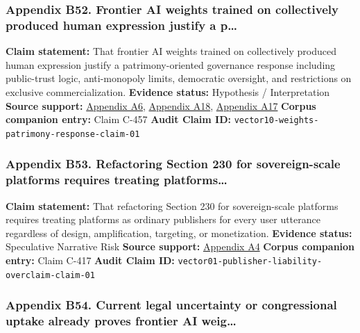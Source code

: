 \documentclass[
  american,
  11pt,
  letterpaper,
]{article}
\begin{document}
\subsubsection{Appendix B52. Frontier AI weights trained on collectively
produced human expression justify a
p\ldots{}}\label{appendix-b52-frontier-ai-weights-trained-on-collectively-produced-human-expression-justify-a-p}

\textbf{Claim statement:} That frontier AI weights trained on
collectively produced human expression justify a patrimony-oriented
governance response including public-trust logic, anti-monopoly limits,
democratic oversight, and restrictions on exclusive commercialization.
\textbf{Evidence status:} Hypothesis / Interpretation \textbf{Source
support:}
\hyperref[appendix-a6-copyright-and-artificial-intelligence-part-3-generative-ai-training-pre-publication-version]{Appendix
A6},
\hyperref[appendix-a18-bipartisan-house-task-force-report-on-artificial-intelligence]{Appendix
A18},
\hyperref[appendix-a17-ai-copyright-weights-a-new-frontier-in-intellectual-property-law]{Appendix
A17} \textbf{Corpus companion entry:} Claim C-457 \textbf{Audit Claim
ID:} \texttt{vector10-weights-patrimony-response-claim-01}

\subsubsection{Appendix B53. Refactoring Section 230 for sovereign-scale
platforms requires treating
platforms\ldots{}}\label{appendix-b53-refactoring-section-230-for-sovereign-scale-platforms-requires-treating-platforms}

\textbf{Claim statement:} That refactoring Section 230 for
sovereign-scale platforms requires treating platforms as ordinary
publishers for every user utterance regardless of design, amplification,
targeting, or monetization. \textbf{Evidence status:} Speculative
Narrative Risk \textbf{Source support:}
\hyperref[appendix-a4-a-look-behind-the-screens-examining-the-data-practices-of-social-media-and-video-streaming-services]{Appendix
A4} \textbf{Corpus companion entry:} Claim C-417 \textbf{Audit Claim
ID:} \texttt{vector01-publisher-liability-overclaim-claim-01}

\subsubsection{Appendix B54. Current legal uncertainty or congressional
uptake already proves frontier AI
weig\ldots{}}\label{appendix-b54-current-legal-uncertainty-or-congressional-uptake-already-proves-frontier-ai-weig}
\end{document}
